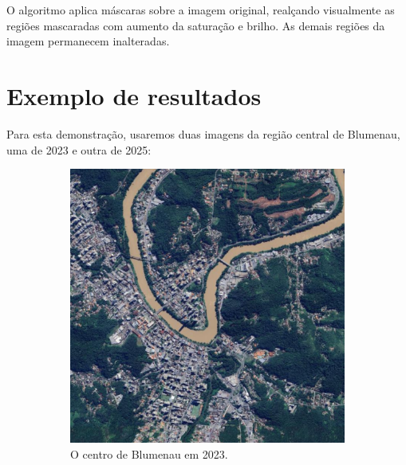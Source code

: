\documentclass{article}
\begin{document}
O algoritmo aplica máscaras sobre a imagem original, realçando visualmente as regiões mascaradas com aumento da saturação e brilho. As demais regiões da imagem permanecem inalteradas.

\section{Exemplo de resultados}

Para esta demonstração, usaremos duas imagens da região central de Blumenau, uma de 2023 e outra de 2025:

\begin{figure}[H]
    \centering
    \begin{subfigure}[b]{0.48\textwidth}
        \includegraphics[width=\textwidth]{../Imagens/012023.png}
        \caption{O centro de Blumenau em 2023.}
        \label{2023}
    \end{subfigure}
    \hfill %
    \begin{subfigure}[b]{0.48\textwidth}

\end{subfigure}
\end{figure}
\end{document}
